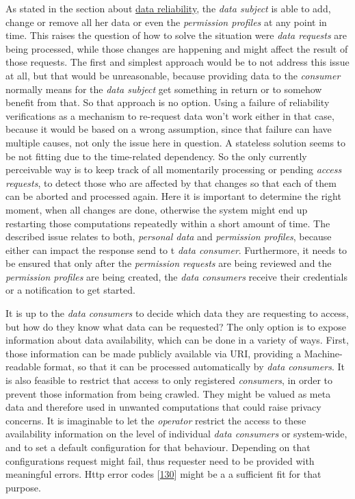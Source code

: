 \documentclass[12pt,english,a4paper,titlepage,cleardoublepage=empty,dottedtoc]{report}
\begin{document}
As stated in the section about \protect\hyperlink{data-reliability}{data
reliability}, the \emph{data subject} is able to add, change or remove
all her data or even the \emph{permission profiles} at any point in
time. This raises the question of how to solve the situation were
\emph{data requests} are being processed, while those changes are
happening and might affect the result of those requests. The first and
simplest approach would be to not address this issue at all, but that
would be unreasonable, because providing data to the \emph{consumer}
normally means for the \emph{data subject} get something in return or to
somehow benefit from that. So that approach is no option. Using a
failure of reliability verifications as a mechanism to re-request data
won't work either in that case, because it would be based on a wrong
assumption, since that failure can have multiple causes, not only the
issue here in question. A stateless solution seems to be not fitting due
to the time-related dependency. So the only currently perceivable way is
to keep track of all momentarily processing or pending \emph{access
requests}, to detect those who are affected by that changes so that each
of them can be aborted and processed again. Here it is important to
determine the right moment, when all changes are done, otherwise the
system might end up restarting those computations repeatedly within a
short amount of time. The described issue relates to both,
\emph{personal data} and \emph{permission profiles}, because either can
impact the response send to t \emph{data consumer}. Furthermore, it
needs to be ensured that only after the \emph{permission requests} are
being reviewed and the \emph{permission profiles} are being created, the
\emph{data consumers} receive their credentials or a notification to get
started.

It is up to the \emph{data consumers} to decide which data they are
requesting to access, but how do they know what data can be requested?
The only option is to expose information about data availability, which
can be done in a variety of ways. First, those information can be made
publicly available via URI, providing a Machine-readable format, so that
it can be processed automatically by \emph{data consumers}. It is also
feasible to restrict that access to only registered \emph{consumers}, in
order to prevent those information from being crawled. They might be
valued as meta data and therefore used in unwanted computations that
could raise privacy concerns. It is imaginable to let the
\emph{operator} restrict the access to these availability information on
the level of individual \emph{data consumers} or system-wide, and to set
a default configuration for that behaviour. Depending on that
configurations request might fail, thus requester need to be provided
with meaningful errors. Http error codes
{[}\protect\hyperlink{ref-web_spec_http-error-codes}{130}{]} might be a
a sufficient fit for that purpose.
\end{document}

